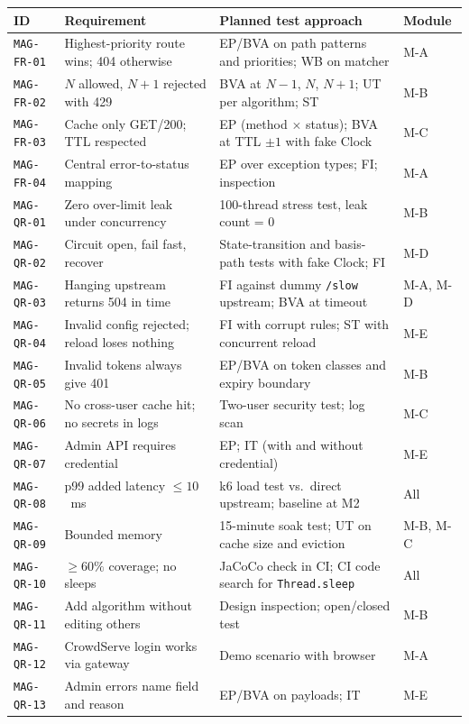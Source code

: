 \documentclass[11pt,a4paper]{article}
\newcommand{\id}[1]{\texttt{#1}}
\begin{document}
\begin{longtable}{L{2.0cm} L{4.4cm} L{6.0cm} L{1.7cm}}
\toprule
\textbf{ID} & \textbf{Requirement} & \textbf{Planned test approach} & \textbf{Module} \\
\midrule
\endhead
\id{MAG-FR-01} & Highest-priority route wins; 404 otherwise & EP/BVA on path patterns and priorities; WB on matcher & M-A \\
\id{MAG-FR-02} & $N$ allowed, $N{+}1$ rejected with 429 & BVA at $N{-}1$, $N$, $N{+}1$; UT per algorithm; ST & M-B \\
\id{MAG-FR-03} & Cache only GET/200; TTL respected & EP (method $\times$ status); BVA at TTL $\pm1$ with fake Clock & M-C \\
\id{MAG-FR-04} & Central error-to-status mapping & EP over exception types; FI; inspection & M-A \\
\id{MAG-QR-01} & Zero over-limit leak under concurrency & 100-thread stress test, leak count = 0 & M-B \\
\id{MAG-QR-02} & Circuit open, fail fast, recover & State-transition and basis-path tests with fake Clock; FI & M-D \\
\id{MAG-QR-03} & Hanging upstream returns 504 in time & FI against dummy \texttt{/slow} upstream; BVA at timeout & M-A, M-D \\
\id{MAG-QR-04} & Invalid config rejected; reload loses nothing & FI with corrupt rules; ST with concurrent reload & M-E \\
\id{MAG-QR-05} & Invalid tokens always give 401 & EP/BVA on token classes and expiry boundary & M-B \\
\id{MAG-QR-06} & No cross-user cache hit; no secrets in logs & Two-user security test; log scan & M-C \\
\id{MAG-QR-07} & Admin API requires credential & EP; IT (with and without credential) & M-E \\
\id{MAG-QR-08} & p99 added latency $\leq 10$~ms & k6 load test vs.\ direct upstream; baseline at M2 & All \\
\id{MAG-QR-09} & Bounded memory & 15-minute soak test; UT on cache size and eviction & M-B, M-C \\
\id{MAG-QR-10} & $\geq 60\%$ coverage; no sleeps & JaCoCo check in CI; CI code search for \texttt{Thread.sleep} & All \\
\id{MAG-QR-11} & Add algorithm without editing others & Design inspection; open/closed test & M-B \\
\id{MAG-QR-12} & CrowdServe login works via gateway & Demo scenario with browser & M-A \\
\id{MAG-QR-13} & Admin errors name field and reason & EP/BVA on payloads; IT & M-E \\
\bottomrule
\end{longtable}
\end{document}
